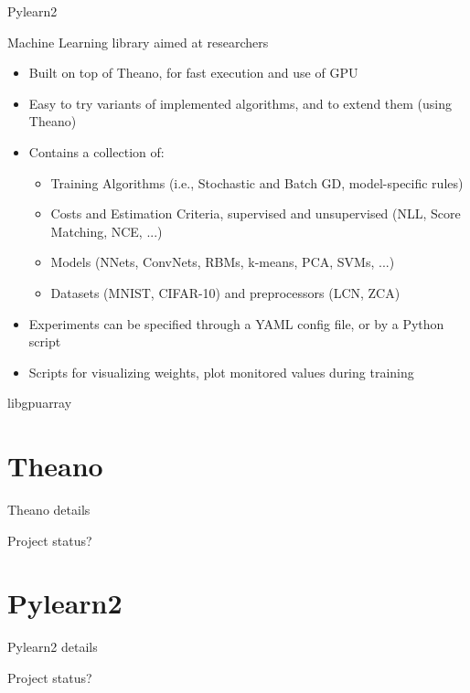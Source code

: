 \documentclass[utf8x,xcolor=pdftex,dvipsnames,table]{beamer}
\begin{document}
\begin{frame}{Pylearn2}

Machine Learning library aimed at researchers

\begin{itemize}
  \item Built on top of Theano, for fast execution and use of GPU
  \item Easy to try variants of implemented algorithms, and to extend them (using Theano)
  \item Contains a collection of:
  \begin{itemize}
    \item Training Algorithms (i.e., Stochastic and Batch GD, model-specific rules)
    \item Costs and Estimation Criteria, supervised and unsupervised (NLL, Score Matching, NCE, ...)
    \item Models (NNets, ConvNets, RBMs, k-means, PCA, SVMs, ...)
    \item Datasets (MNIST, CIFAR-10) and preprocessors (LCN, ZCA)
  \end{itemize}
  \item Experiments can be specified through a YAML config file, or by a Python script
  \item Scripts for visualizing weights, plot monitored values during training
\end{itemize}

\end{frame}


\begin{frame}{libgpuarray}
\end{frame}


\section{Theano}
\begin{frame}{Theano details}
\end{frame}
\begin{frame}{Project status?}
\end{frame}


\section{Pylearn2}
\begin{frame}{Pylearn2 details}
\end{frame}
\begin{frame}{Project status?}
\end{frame}
\end{document}
